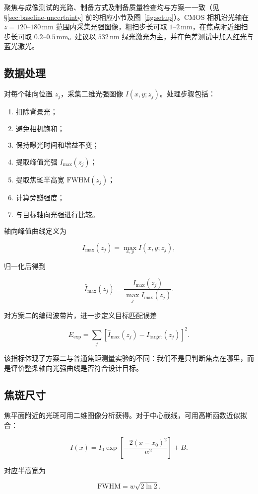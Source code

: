 \documentclass[UTF8,a4paper,11pt]{ctexart}
\begin{document}
聚焦与成像测试的光路、制备方式及制备质量检查均与方案一一致（见 §\ref{sec:baseline-uncertainty} 前的相应小节及图~\ref{fig:setup}）。CMOS 相机沿光轴在 $z=120$--$180\,\mathrm{mm}$ 范围内采集光强图像，粗扫步长可取 $1$--$2\,\mathrm{mm}$，在焦点附近细扫步长可取 $0.2$--$0.5\,\mathrm{mm}$。建议以 $532\,\mathrm{nm}$ 绿光激光为主，并在色差测试中加入红光与蓝光激光。

\subsection{数据处理}

对每个轴向位置 $z_j$，采集二维光强图像 $I(x,y;z_j)$。处理步骤包括：

\begin{enumerate}[label=(\arabic*)]
\item 扣除背景光；
\item 避免相机饱和；
\item 保持曝光时间和增益不变；
\item 提取峰值光强 $I_{\max}(z_j)$；
\item 提取焦斑半高宽 $\mathrm{FWHM}(z_j)$；
\item 计算旁瓣强度；
\item 与目标轴向光强进行比较。
\end{enumerate}

轴向峰值曲线定义为

\[
I_{\max}(z_j)=\max_{x,y} I(x,y;z_j),
\]

归一化后得到

\[
\widehat I_{\max}(z_j)=
\frac{I_{\max}(z_j)}
{\max_j I_{\max}(z_j)}.
\]

对方案二的编码波带片，进一步定义目标匹配误差

\[
E_{\mathrm{exp}}
=
\sum_j
\left[
\widehat I_{\max}(z_j)
-
I_{\mathrm{target}}(z_j)
\right]^2.
\]

该指标体现了方案二与普通焦距测量实验的不同：我们不是只判断焦点在哪里，而是评价整条轴向光强曲线是否符合设计目标。

\subsection{焦斑尺寸}

焦平面附近的光斑可用二维图像分析获得。对于中心截线，可用高斯函数近似拟合：

\[
I(x)=I_0
\exp\left[
-\frac{2(x-x_0)^2}{w^2}
\right]
+B.
\]

对应半高宽为

\[
\mathrm{FWHM}=w\sqrt{2\ln 2}.
\]
\end{document}
